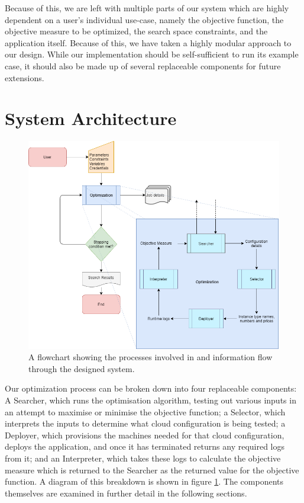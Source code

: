 \documentclass{report}
\begin{document}
Because of this, we are left with multiple parts of our system which are highly dependent on a user's individual use-case, namely the objective function, the objective measure to be optimized, the search space constraints, and the application itself. Because of this, we have taken a highly modular approach to our design. While our implementation should be self-sufficient to run its example case, it should also be made up of several replaceable components for future extensions.
 

\section{System Architecture}
\begin{figure}[!hb]
  \centering
   \includegraphics[scale=0.5]{Design_flowchart}
  \caption{A flowchart showing the processes involved in and information flow through the designed system.}
  \label{fig:design}
\end{figure}
\newpage
Our optimization process can be broken down into four replaceable components: A Searcher, which runs the optimisation algorithm, testing out various inputs in an attempt to maximise or minimise the objective function; a Selector, which interprets the inputs to determine what cloud configuration is being tested; a Deployer, which provisions the machines needed for that cloud configuration, deploys the application, and once it has terminated returns any required logs from it; and an Interpreter, which takes these logs to calculate the objective measure which is returned to the Searcher as the returned value for the objective function. A diagram of this breakdown is shown in figure \ref{fig:design}. The components themselves are examined in further detail in the following sections.
 
\end{document}
